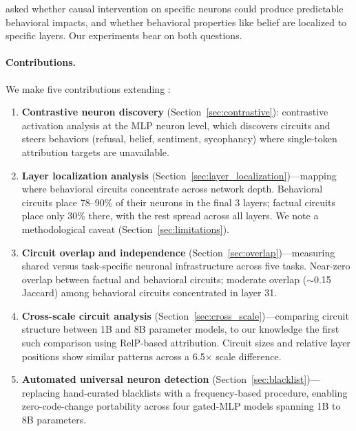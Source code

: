 \documentclass[11pt]{article}
\begin{document}
\citet{chalnick2025goodfire} asked whether causal intervention on specific neurons could produce predictable behavioral impacts, and whether behavioral properties like belief are localized to specific layers.
Our experiments bear on both questions.

\paragraph{Contributions.}
We make five contributions extending \citet{arora2025circuits}:

\begin{enumerate}[leftmargin=2em]
    \item \textbf{Contrastive neuron discovery} (Section~\ref{sec:contrastive}): contrastive activation analysis at the MLP neuron level, which discovers circuits and steers behaviors (refusal, belief, sentiment, sycophancy) where single-token attribution targets are unavailable.

    \item \textbf{Layer localization analysis} (Section~\ref{sec:layer_localization})---mapping where behavioral circuits concentrate across network depth. Behavioral circuits place 78--90\% of their neurons in the final 3 layers; factual circuits place only 30\% there, with the rest spread across all layers. We note a methodological caveat (Section~\ref{sec:limitations}).

    \item \textbf{Circuit overlap and independence} (Section~\ref{sec:overlap})---measuring shared versus task-specific neuronal infrastructure across five tasks. Near-zero overlap between factual and behavioral circuits; moderate overlap (${\sim}$0.15 Jaccard) among behavioral circuits concentrated in layer 31.

    \item \textbf{Cross-scale circuit analysis} (Section~\ref{sec:cross_scale})---comparing circuit structure between 1B and 8B parameter models, to our knowledge the first such comparison using RelP-based attribution. Circuit sizes and relative layer positions show similar patterns across a 6.5$\times$ scale difference.

    \item \textbf{Automated universal neuron detection} (Section~\ref{sec:blacklist})---replacing hand-curated blacklists with a frequency-based procedure, enabling zero-code-change portability across four gated-MLP models spanning 1B to 8B parameters.
\end{enumerate}
\end{document}
